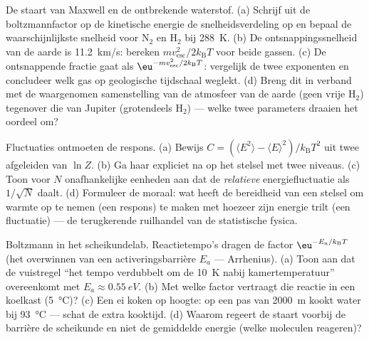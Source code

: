 \begin{exercise}[$\star\star$]\label{exo:b3:canonical-ensemble:7}
De staart van Maxwell en de ontbrekende waterstof. (a) Schrijf uit de
boltzmannfactor op de kinetische energie de snelheidsverdeling op en
bepaal de waarschijnlijkste snelheid voor N$_2$ en H$_2$ bij \qty{288}{K}.
(b) De ontsnappingssnelheid van de aarde is \qty{11.2}{km/s}: bereken
$mv_{\text{esc}}^2/2k_{\text{B}}T$ voor beide gassen. (c) De ontsnappende
fractie gaat als $\eu^{-mv_{\text{esc}}^2/2k_{\text{B}}T}$: vergelijk de
twee exponenten en concludeer welk gas op geologische tijdschaal weglekt.
(d) Breng dit in verband met de waargenomen samenstelling van de atmosfeer
van de aarde (geen vrije H$_2$) tegenover die van Jupiter (grotendeels
H$_2$) --- welke twee parameters draaien het oordeel om?
\end{exercise}

\begin{exercise}[$\star\star$]\label{exo:b3:canonical-ensemble:8}
Fluctuaties ontmoeten de respons. (a) Bewijs $C = (\langle E^2\rangle -
\langle E\rangle^2)/k_{\text{B}}T^2$ uit twee afgeleiden van $\ln
Z$. (b)
Ga haar expliciet na op het stelsel met twee niveaus. (c) Toon voor $N$
onafhankelijke eenheden aan dat de \emph{relatieve} energiefluctuatie als
$1/\sqrt N$ daalt. (d) Formuleer de moraal: wat heeft de bereidheid van een
stelsel om warmte op te nemen (een respons) te maken met hoezeer zijn
energie trilt (een fluctuatie) --- de terugkerende ruilhandel van de
statistische fysica.
\end{exercise}

\begin{exercise}[$\star\star$]\label{exo:b3:canonical-ensemble:9}
Boltzmann in het scheikundelab. Reactietempo's dragen de factor
$\eu^{-E_a/k_{\text{B}}T}$ (het overwinnen van een activeringsbarrière
$E_a$ --- Arrhenius). (a) Toon aan dat de vuistregel ``het tempo
verdubbelt om de \qty{10}{K} nabij kamertemperatuur'' overeenkomt met $E_a \approx
\qty{0.55}{eV}$. (b) Met welke factor vertraagt die reactie in een
koelkast (\qty{5}{\celsius})? (c) Een ei koken op hoogte: op een pas van
\qty{2000}{m} kookt water bij \qty{93}{\celsius} --- schat de extra
kooktijd. (d) Waarom regeert de staart voorbij de barrière de scheikunde
en niet de gemiddelde energie (welke moleculen reageren)?
\end{exercise}

